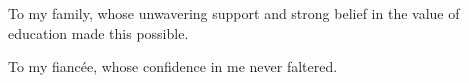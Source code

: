 \thispagestyle{empty}

\vspace*{3cm}

\begin{center}
To my family, whose unwavering support and strong belief in the value of education made this possible.
\end{center}

\medskip

\begin{center}
To my fianc\'{e}e, whose confidence in me never faltered.
\end{center}



